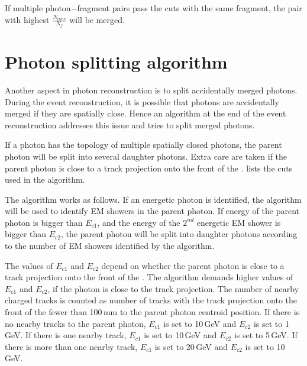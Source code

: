 If multiple photon$-$fragment pairs pass the cuts with the same fragment, the pair with highest $\frac{N_{cone}}{N_f}$ will be merged.



\section{Photon splitting algorithm}
\label{sec:photonSplitting}


Another aspect in photon reconstruction is to split accidentally merged photons. During the event reconstruction, it is possible that photons are accidentally merged if they are spatially close. Hence an algorithm at the end of the event reconstruction addresses this issue and tries to split merged photons.

If a photon has the  topology of multiple spatially closed photons, the parent photon will be split into several daughter photons. Extra care are taken if the parent photon is close to a track projection onto the front of the \ECAL.  lists the cuts used in the algorithm.

The algorithm works as follows. If an energetic photon is identified, the \peakFinding algorithm will  be used to identify EM showers in the parent photon. If energy of the parent photon is bigger than $E_{c1}$, and the energy of the $2^{nd}$ energetic EM shower is bigger than $E_{c2}$, the parent photon will be split into daughter photons according to the number of EM showers identified by the \peakFinding algorithm.

The values of $E_{c1}$ and $E_{c2}$ depend on whether the parent photon is close to a track projection onto the front of the \ECAL. The algorithm demands  higher values of $E_{c1}$ and   $E_{c2}$, if the photon is close to the track projection. The number of nearby charged tracks is counted as number of tracks with the track projection onto the front of the \ECAL fewer than 100\,mm to the parent photon centroid position. If there is no nearby tracks to the parent photon, $E_{c1}$ is set to 10\,GeV and $E_{c2}$ is set to 1\,GeV. If there is one nearby track, $E_{c1}$ is set to 10\,GeV and $E_{c2}$ is set to 5\,GeV. If there is more than one nearby track, $E_{c1}$ is set to 20\,GeV and $E_{c2}$ is set to 10\,GeV.


